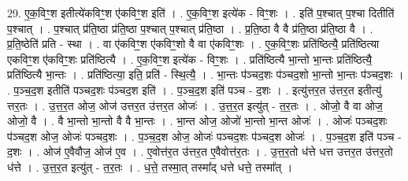 \documentclass[17pt]{extarticle}
\begin{document}
29. ए॒क॒विꣳ॒॒श इतीत्ये॑कविꣳ॒॒श ए॑कविꣳ॒॒श इति॑ । . ए॒क॒विꣳ॒॒श इत्ये॑क - विꣳ॒॒शः । . इति॑ प॒श्चात् प॒श्चा दितीति॑ प॒श्चात् । . प॒श्चात् प्र॑ति॒ष्ठा प्र॑ति॒ष्ठा प॒श्चात् प॒श्चात् प्र॑ति॒ष्ठा । . प्र॒ति॒ष्ठा वै वै प्र॑ति॒ष्ठा प्र॑ति॒ष्ठा वै । . प्र॒ति॒ष्ठेति॑ प्रति - स्था । . वा ए॑कविꣳ॒॒श ए॑कविꣳ॒॒शो वै वा ए॑कविꣳ॒॒शः । . ए॒क॒विꣳ॒॒शः प्रति॑ष्ठित्यै॒ प्रति॑ष्ठित्या एकविꣳ॒॒श ए॑कविꣳ॒॒शः प्रति॑ष्ठित्यै । . ए॒क॒विꣳ॒॒श इत्ये॑क - विꣳ॒॒शः । . प्रति॑ष्ठित्यै भा॒न्तो भा॒न्तः प्रति॑ष्ठित्यै॒ प्रति॑ष्ठित्यै भा॒न्तः । . प्रति॑ष्ठित्या॒ इति॒ प्रति॑ - स्थि॒त्यै॒ । . भा॒न्तः प॑ञ्चद॒शः प॑ञ्चद॒शो भा॒न्तो भा॒न्तः प॑ञ्चद॒शः । . प॒ञ्च॒द॒श इतीति॑ पञ्चद॒शः प॑ञ्चद॒श इति॑ । . प॒ञ्च॒द॒श इति॑ पञ्च - द॒शः । . इत्यु॑त्तर॒त उ॑त्तर॒त इतीत्यु॑ त्तर॒तः । . उ॒त्त॒र॒त ओज॒ ओज॑ उत्तर॒त उ॑त्तर॒त ओजः॑ । . उ॒त्त॒र॒त इत्यु॑त् - त॒र॒तः । . ओजो॒ वै वा ओज॒ ओजो॒ वै । . वै भा॒न्तो भा॒न्तो वै वै भा॒न्तः । . भा॒न्त ओज॒ ओजो॑ भा॒न्तो भा॒न्त ओजः॑ । . ओजः॑ पञ्चद॒शः प॑ञ्चद॒श ओज॒ ओजः॑ पञ्चद॒शः । . प॒ञ्च॒द॒श ओज॒ ओजः॑ पञ्चद॒शः प॑ञ्चद॒श ओजः॑ । . प॒ञ्च॒द॒श इति॑ पञ्च - द॒शः । . ओज॑ ए॒वैवौज॒ ओज॑ ए॒व । . ए॒वोत्त॑र॒त उ॑त्तर॒त ए॒वैवोत्त॑र॒तः । . उ॒त्त॒र॒तो ध॑त्ते धत्त उत्तर॒त उ॑त्तर॒तो ध॑त्ते । . उ॒त्त॒र॒त इत्यु॑त् - त॒र॒तः । . ध॒त्ते॒ तस्मा॒त् तस्मा᳚द् धत्ते धत्ते॒ तस्मा᳚त् । \newline
\end{document}
